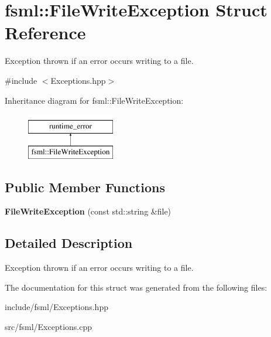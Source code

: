 \hypertarget{structfsml_1_1FileWriteException}{\section{fsml\-:\-:File\-Write\-Exception Struct Reference}
\label{structfsml_1_1FileWriteException}
}


Exception thrown if an error occurs writing to a file.  




{\ttfamily \#include $<$Exceptions.\-hpp$>$}

Inheritance diagram for fsml\-:\-:File\-Write\-Exception\-:\begin{figure}[H]
\begin{center}
\leavevmode
\includegraphics[height=2.000000cm]{structfsml_1_1FileWriteException}
\end{center}
\end{figure}
\subsection*{Public Member Functions}
\begin{DoxyCompactItemize}
\item 
\hypertarget{structfsml_1_1FileWriteException_aa8b9c1d366dbf76392a775279bc2dd19}{{\bfseries File\-Write\-Exception} (const std\-::string \&file)}\label{structfsml_1_1FileWriteException_aa8b9c1d366dbf76392a775279bc2dd19}

\end{DoxyCompactItemize}


\subsection{Detailed Description}
Exception thrown if an error occurs writing to a file. 



The documentation for this struct was generated from the following files\-:\begin{DoxyCompactItemize}
\item 
include/fsml/Exceptions.\-hpp\item 
src/fsml/Exceptions.\-cpp\end{DoxyCompactItemize}
